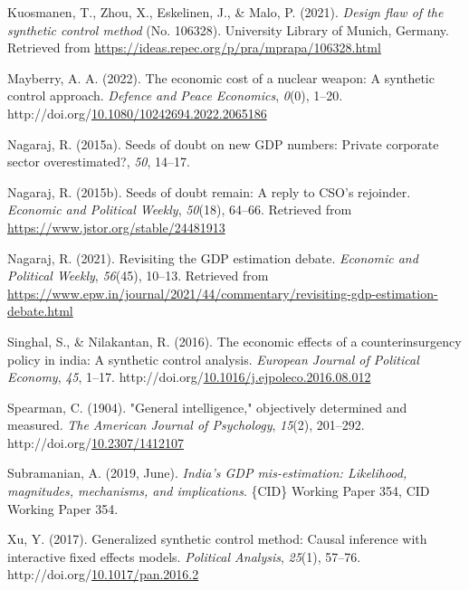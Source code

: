 \documentclass[12pt,nobind, a4paper]{reedthesis}
\newlength{\cslhangindent}
\newenvironment{CSLReferences}[2] %
{%
	\setlength{\parindent}{0pt}
	\ifodd #1 \everypar{\setlength{\hangindent}{\cslhangindent}}\ignorespaces\fi
	\ifnum #2 > 0
	\setlength{\parskip}{#2\baselineskip}
	\fi
}%
{}
\begin{document}
\begin{CSLReferences}{1}{0}
 \leavevmode{}%
 Kuosmanen, T., Zhou, X., Eskelinen, J., \& Malo, P. (2021). \emph{Design flaw of the synthetic control method} (No. 106328). University Library of Munich, Germany. Retrieved from \url{https://ideas.repec.org/p/pra/mprapa/106328.html}

 \leavevmode{}%
 Mayberry, A. A. (2022). The economic cost of a nuclear weapon: A synthetic control approach. \emph{Defence and Peace Economics}, \emph{0}(0), 1--20. http://doi.org/\href{https://doi.org/10.1080/10242694.2022.2065186}{10.1080/10242694.2022.2065186}

 \leavevmode{}%
 Nagaraj, R. (2015a). Seeds of doubt on new {GDP} numbers: Private corporate sector overestimated?, \emph{50}, 14--17.

 \leavevmode{}%
 Nagaraj, R. (2015b). Seeds of doubt remain: A reply to {CSO}'s rejoinder. \emph{Economic and Political Weekly}, \emph{50}(18), 64--66. Retrieved from \url{https://www.jstor.org/stable/24481913}

 \leavevmode{}%
 Nagaraj, R. (2021). Revisiting the {GDP} estimation debate. \emph{Economic and Political Weekly}, \emph{56}(45), 10--13. Retrieved from \url{https://www.epw.in/journal/2021/44/commentary/revisiting-gdp-estimation-debate.html}

 \leavevmode{}%
 Singhal, S., \& Nilakantan, R. (2016). The economic effects of a counterinsurgency policy in india: A synthetic control analysis. \emph{European Journal of Political Economy}, \emph{45}, 1--17. http://doi.org/\href{https://doi.org/10.1016/j.ejpoleco.2016.08.012}{10.1016/j.ejpoleco.2016.08.012}

 \leavevmode{}%
 Spearman, C. (1904). "General intelligence," objectively determined and measured. \emph{The American Journal of Psychology}, \emph{15}(2), 201--292. http://doi.org/\href{https://doi.org/10.2307/1412107}{10.2307/1412107}

 \leavevmode{}%
 Subramanian, A. (2019, June). \emph{India's {GDP} mis-estimation: Likelihood, magnitudes, mechanisms, and implications}. \{CID\} Working Paper 354, {CID} Working Paper 354.

 \leavevmode{}%
 Xu, Y. (2017). Generalized synthetic control method: Causal inference with interactive fixed effects models. \emph{Political Analysis}, \emph{25}(1), 57--76. http://doi.org/\href{https://doi.org/10.1017/pan.2016.2}{10.1017/pan.2016.2}

 \end{CSLReferences}
	
	
\end{document}
